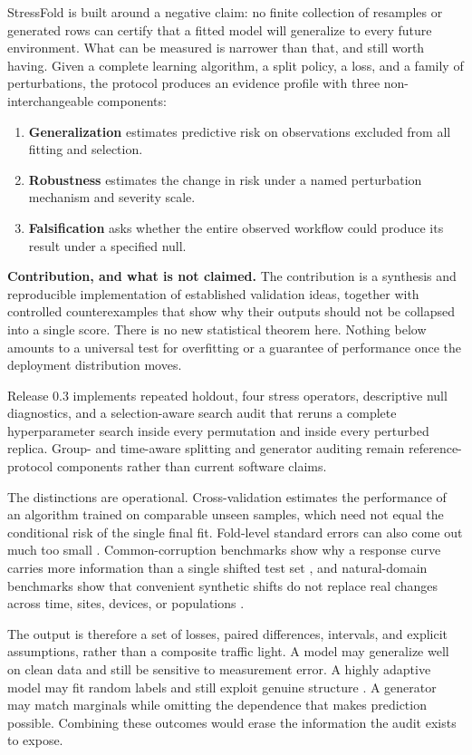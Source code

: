 \documentclass[10pt,twocolumn]{article}
\begin{document}
StressFold is built around a negative claim: no finite collection of resamples or generated rows can certify that a fitted model will generalize to every future environment. What can be measured is narrower than that, and still worth having. Given a complete learning algorithm, a split policy, a loss, and a family of perturbations, the protocol produces an evidence profile with three non-interchangeable components:
\begin{enumerate}
  \item \textbf{Generalization} estimates predictive risk on observations excluded from all fitting and selection.
  \item \textbf{Robustness} estimates the change in risk under a named perturbation mechanism and severity scale.
  \item \textbf{Falsification} asks whether the entire observed workflow could produce its result under a specified null.
\end{enumerate}

\noindent\textbf{Contribution, and what is not claimed.}
The contribution is a synthesis and reproducible implementation of established validation ideas, together with controlled counterexamples that show why their outputs should not be collapsed into a single score. There is no new statistical theorem here. Nothing below amounts to a universal test for overfitting or a guarantee of performance once the deployment distribution moves.

Release 0.3 implements repeated holdout, four stress operators, descriptive null diagnostics, and a selection-aware search audit that reruns a complete hyperparameter search inside every permutation and inside every perturbed replica. Group- and time-aware splitting and generator auditing remain reference-protocol components rather than current software claims.

The distinctions are operational. Cross-validation estimates the performance of an algorithm trained on comparable unseen samples, which need not equal the conditional risk of the single final fit. Fold-level standard errors can also come out much too small \citep{bates2024crossvalidation}. Common-corruption benchmarks show why a response curve carries more information than a single shifted test set \citep{hendrycks2019corruptions}, and natural-domain benchmarks show that convenient synthetic shifts do not replace real changes across time, sites, devices, or populations \citep{koh2021wilds}.

The output is therefore a set of losses, paired differences, intervals, and explicit assumptions, rather than a composite traffic light. A model may generalize well on clean data and still be sensitive to measurement error. A highly adaptive model may fit random labels and still exploit genuine structure \citep{zhang2017rethinking}. A generator may match marginals while omitting the dependence that makes prediction possible. Combining these outcomes would erase the information the audit exists to expose.
\end{document}
